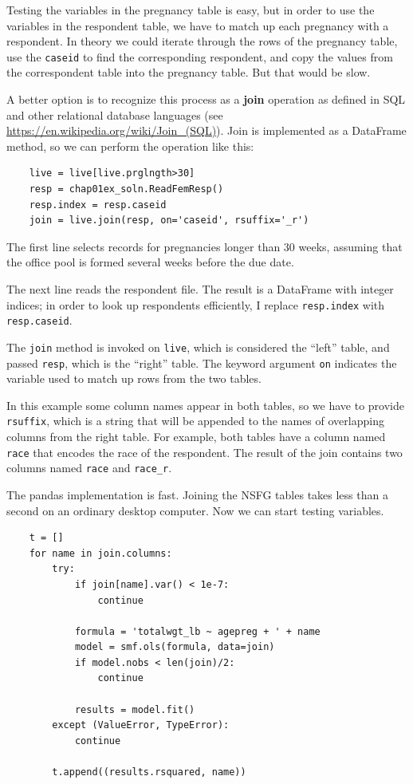 \documentclass[12pt]{book}
\begin{document}
Testing the variables in the pregnancy table is easy, but in order to
use the variables in the respondent table, we have to match up each
pregnancy with a respondent.  In theory we could iterate through the
rows of the pregnancy table, use the {\tt caseid} to find the
corresponding respondent, and copy the values from the
correspondent table into the pregnancy table.  But that would be slow.

A better option is to recognize this process as a {\bf join} operation
as defined in SQL and other relational database languages (see
\url{https://en.wikipedia.org/wiki/Join_(SQL)}).  Join is implemented
as a DataFrame method, so we can perform the operation like this:

\begin{verbatim}
    live = live[live.prglngth>30]
    resp = chap01ex_soln.ReadFemResp()
    resp.index = resp.caseid
    join = live.join(resp, on='caseid', rsuffix='_r')
\end{verbatim}

The first line selects records for pregnancies longer than 30 weeks,
assuming that the office pool is formed several weeks before the
due date.

The next line reads the respondent file.  The result is a DataFrame
with integer indices; in order to look up respondents efficiently,
I replace {\tt resp.index} with {\tt resp.caseid}. 

The {\tt join} method is invoked on {\tt live}, which is considered
the ``left'' table, and passed {\tt resp}, which is the ``right'' table.
The keyword argument {\tt on} indicates the variable used to match up
rows from the two tables.

In this example some column names appear in both tables,
so we have to provide {\tt rsuffix}, which is a string that will be
appended to the names of overlapping columns from the right table.
For example, both tables have a column named {\tt race} that encodes
the race of the respondent.  The result of the join contains two
columns named {\tt race} and \verb"race_r".

The pandas implementation is fast.  Joining the NSFG tables takes
less than a second on an ordinary desktop computer.
Now we can start testing variables.

\begin{verbatim}
    t = []
    for name in join.columns:
        try:
            if join[name].var() < 1e-7:
                continue

            formula = 'totalwgt_lb ~ agepreg + ' + name
            model = smf.ols(formula, data=join)
            if model.nobs < len(join)/2:
                continue

            results = model.fit()
        except (ValueError, TypeError):
            continue

        t.append((results.rsquared, name))
\end{verbatim}
\end{document}
